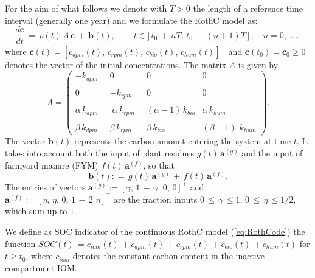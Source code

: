 \noindent For the aim of what follows we denote with $T >0$ the length of a reference time interval  (generally one year) and we formulate the  RothC model as:
\begin{equation}\label{eq:RothCode}
\displaystyle \frac{d\mathbf{c}}{dt}\, = \, \rho(t)\, A\, \mathbf{c} \, +\, \mathbf{b}(t),\, \qquad t\in ]\,t_0\,+\,nT,\, t_0\,+\,(n+1)T\,]\,, \quad  n=0,\,\,\dots,
\end{equation}
where $\mathbf{c}(t)=[c_{dpm}(t),\, c_{rpm}(t),\, c_{bio}(t),\, c_{hum}(t)]^\intercal$ and 
$\mathbf{c}(t_0)=\mathbf{c}_0 \geq 0$ denotes the vector of the initial concentrations. 
The matrix $A$ is given by 
$$
A=\left(\begin{array}{cccc}
-k_{dpm} &0 & 0&0 \\\\
\displaystyle 0 & -k_{rpm}& 0 & 0\\\\
 \displaystyle \alpha\,k_{dpm}\;\; & \;\alpha\,k_{rpm}\;\;& (\alpha-1)\,k_{bio}& \alpha\,k_{hum}\\\\
\displaystyle \beta\, k_{dpm} & \beta\, k_{rpm} & \beta\, k_{bio} &(\beta-1) \,\, k_{hum}
 \end{array}\right).
$$
\noindent The vector $\mathbf{b}(t)$ represents the carbon amount entering the system at time $t$. It %
takes into account both the input of plant residues $ g(t) \, \mathbf{a}^{(g)} $ and the input of farmyard manure (FYM) $f(t)\, \mathbf{a}^{(f)}$, so that $$ \mathbf{b}(t): =\, g(t) \, \mathbf{a}^{(g)} \,+\, f(t)\, \mathbf{a}^{(f)}.$$ The entries of vectors $\mathbf{a}^{(g)}:=[\gamma, \,1\,-\, \gamma, \,0, \, 0]^\intercal$ and $\mathbf{a}^{(f)}:=[\eta, \, \eta,\, 0, \, 1\,-\,2\,\, \eta]^\intercal$ are the fraction inputs $0\, \leq \, \gamma\,\leq 1$, $0\, \leq \, \eta\,\leq 1/2$, which sum up to $1$.

\begin{definition}
\label{SOCind}
We define as SOC indicator of the continuous RothC model (\ref{eq:RothCode}) the function $SOC(t)\,= c_{iom}{(t)}\,+c_{dpm}(t)\,+ c_{rpm}(t)\,+ c_{bio}(t)\,+ c_{hum}(t)$ for $t\geq t_0$,
where $c_{iom}$ denotes the constant carbon content in the inactive compartment IOM.
\end{definition}

